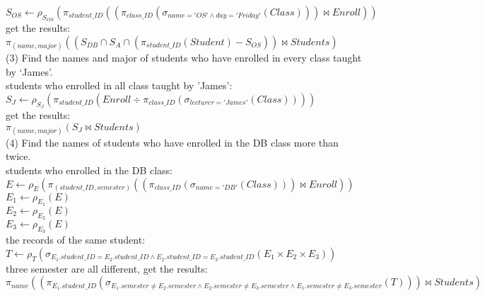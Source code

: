 \documentclass[]{article}
\begin{document}
	$S_{OS}\leftarrow \rho_{S_{OS}}(\pi_{student\_ID}((\pi_{class\_ID}(\sigma_{name='OS'\wedge day='Friday'}(Class)))\bowtie Enroll))$\\
	
	get the results:\\
	
	$\pi_{(name,major)}((S_{DB}\cap S_{A}\cap(\pi_{student\_ID}(Student)-S_{OS}))\bowtie Students)$\\
	
	\noindent(3) Find the names and major of students who have enrolled in every class taught by 
	‘James’.\\
	
	students who enrolled in all class taught by 'James':\\
	
	$S_{J}\leftarrow \rho_{S_{J}}(\pi_{student\_ID}(Enroll\div\pi_{class\_ID}(\sigma_{lecturer='James'}(Class))))$\\
	
	get the results:\\
	
	$\pi_{(name,major)}(S_{J}\bowtie Students)$\\
	
	\noindent(4) Find the names of students who have enrolled in the DB class more than twice.\\
	
	students who enrolled in the DB class:\\
	
	$E\leftarrow \rho_{E}(\pi_{(student\_ID,semester)}((\pi_{class\_ID}(\sigma_{name='DB'}(Class)))\bowtie Enroll))$\\
	
	$E_{1}\leftarrow \rho_{E_{1}}(E)$\\
	
	$E_{2}\leftarrow \rho_{E_{2}}(E)$\\
	
	$E_{3}\leftarrow \rho_{E_{3}}(E)$\\
	
	the records of the same student:\\
	
	$T\leftarrow \rho_{T}(\sigma_{E_{1}.student\_ID=E_{2}.student\_ID\wedge E_{2}.student\_ID=E_{3}.student\_ID}(E_{1}\times E_{2}\times E_{3}))$\\
	
	three semester are all different, get the results:\\
	
	$\pi_{name}((\pi_{E_{1}.student\_ID}(\sigma_{E_{1}.semester\neq E_{2}.semester\wedge E_{2}.semester\neq E_{3}.semester\wedge E_{1}.semester\neq E_{3}.semester}(T)))\bowtie Students)$\\
	
\end{document}
